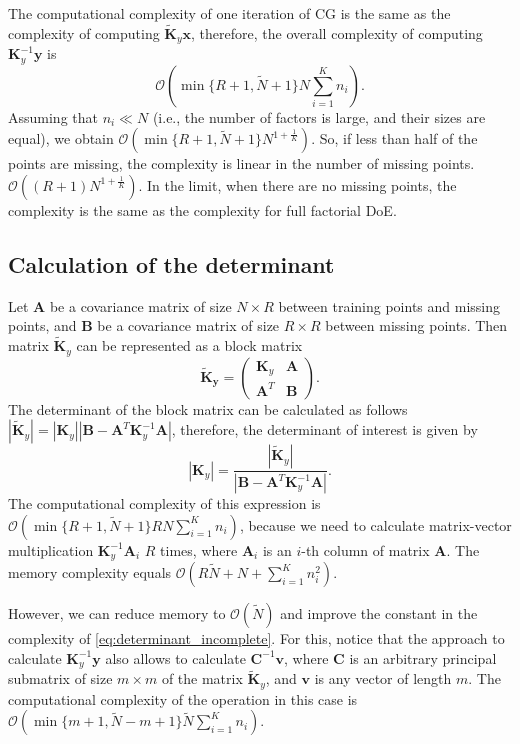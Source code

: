 The computational complexity of one iteration of CG is the same as the complexity
of computing $\mathbf{\widetilde{K}}_y \mathbf{x}$,
therefore, the overall complexity of computing $\mathbf{K}_y^{-1}\mathbf{y}$ is
\[
\mathcal{O}\left (\min\{R + 1, \widetilde{N} + 1\} N\sum_{i = 1}^K n_i \right ).
\]
Assuming
that $n_i \ll N$ (i.e., the number of factors is large, and their sizes are equal),
we obtain
$\mathcal{O}(\min\{R + 1, \widetilde{N} + 1\} N^{1 + \frac{1}{K}})$.
So, if less than half of the points are missing, the complexity is linear in the number of missing points.
$\mathcal{O}((R + 1)N^{1 + \frac{1}{K}})$.
In the limit, when there are no missing points, the complexity is the same
as the complexity for full factorial DoE.


\subsection{Calculation of the determinant}
Let $\mathbf{A}$ be a covariance matrix of size $N \times R$ between training points and
missing points,
and $\mathbf{B}$ be a covariance matrix of size $R \times R$ between missing points.
Then matrix $\mathbf{\widetilde{K}}_y$ can be represented as a block matrix
\[
\mathbf{\widetilde{K}_y} = \begin{pmatrix}
  \mathbf{K}_y & \mathbf{A} \\
  \mathbf{A}^T & \mathbf{B}
\end{pmatrix}.
\]
The determinant of the block matrix can be calculated as follows
$|\mathbf{\widetilde{K}}_y | = |\mathbf{K}_y| |\mathbf{B} - \mathbf{A}^T \mathbf{K}_y^{-1}\mathbf{A}|$,
therefore, the determinant of interest is given by
\begin{equation}
\label{eq:determinant_incomplete}
|\mathbf{K}_y| = \frac{|\mathbf{\widetilde{K}}_y |}{|\mathbf{B} - \mathbf{A}^T \mathbf{K}_y^{-1}\mathbf{A}|}.
\end{equation}
The computational complexity of this expression is
$\mathcal{O}(\min\{R + 1, \widetilde{N} + 1\} R N\sum_{i = 1}^K n_i)$,
because we need to calculate matrix-vector multiplication $\mathbf{K}_y^{-1}\mathbf{A}_i$
$R$ times,
where $\mathbf{A}_i$ is an $i$-th column of matrix $\mathbf{A}$.
The memory complexity equals $\mathcal{O}(R\widetilde{N} + N + \sum_{i = 1}^K n_i^2)$.

However, we can reduce memory to $\mathcal{O}(\widetilde{N})$ and improve the constant in the complexity of
\eqref{eq:determinant_incomplete}.
For this, notice that the approach to calculate $\mathbf{K}_y^{-1}\mathbf{y}$
also allows to calculate $\mathbf{C}^{-1}\mathbf{v}$,
where $\mathbf{C}$ is an arbitrary principal submatrix of size $m \times m$
of the matrix $\mathbf{\widetilde{K}}_y$,
and $\mathbf{v}$ is any vector of length $m$.
The computational complexity of the operation in this case is
$\mathcal{O} \left (\min\{m + 1, \widetilde{N} - m + 1\}
\widetilde{N}\sum_{i = 1}^K n_i \right )$.

